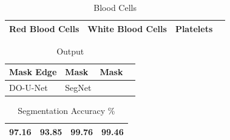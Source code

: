 \documentclass[conference]{IEEEtran}
\begin{document}
\begin{table}[htbp]
\centering
\caption{Blood Cells}
\label{tab:bloodcells}
\begin{tabular}{llll}
\hline
Red Blood Cells & White Blood Cells & Platelets & \\
\hline
\end{tabular}
\end{table}
\begin{table}[htbp]
\centering
\caption{Output}
\label{tab:output}
\begin{tabular}{llll}
\hline
Mask Edge & Mask & Mask & \\
\hline
DO-U-Net & SegNet & & \\
\hline
\end{tabular}
\end{table}
\begin{table}[htbp]
\centering
\caption{Segmentation Accuracy \%}
\label{tab:segmentation}
\begin{tabular}{llll}
\hline
97.16 & 93.85 & 99.76 & 99.46 \\
\hline
\end{tabular}
\end{table}
\end{document}
